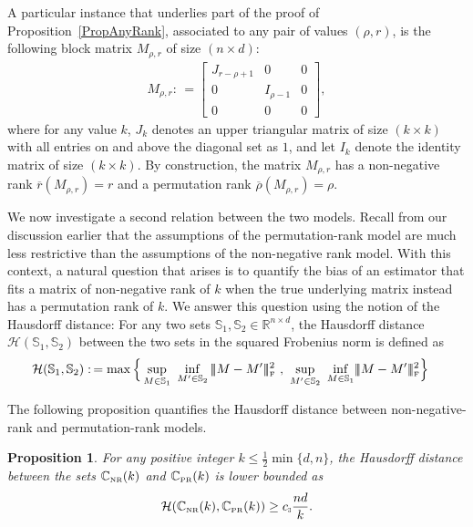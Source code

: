 \documentclass[11pt, hidelinks]{article} %
\newtheorem{proposition}{Proposition}
\newcommand{\matsnorm}[2]{|\!|\!| #1 | \! | \!|_{{#2}}}
\newcommand{\frobnorm}[1]{\ensuremath{\matsnorm{#1}{\mbox{\tiny{F}}}}}
\newcommand{\hausDis}{\mathcal{H}}
\newcommand{\defn}{\ensuremath{:\,=}}
\newcommand{\reals}{\ensuremath{\mathbb{R}}}
\newcommand{\upperonesmx}{J}
\newcommand{\identitymx}{I}
\newcommand{\numrows}{n}
\newcommand{\numcols}{d}
\newcommand{\plaincon}{c}
\newcommand{\UMODEL}{\ensuremath{\plaincon_{\mbox{\scalebox{.5}{3}}}}}
\newcommand{\wtmatrix}{M}
\newcommand{\wt}{\wtmatrix}
\newcommand{\matrixset}{\mathbb{C}}
\newcommand{\nnset}{\matrixset_{\mbox{\tiny NR}}}
\newcommand{\permset}{\matrixset_{\mbox{\tiny PR}}}
\newcommand{\nnrank}{r}
\newcommand{\permrank}{\rho}
\newcommand{\temprank}{k}
\newcommand{\fnpermrank}[1]{\overline{\permrank}(#1)}
\newcommand{\fnnnrank}[1]{\overline{\nnrank}(#1)}
\newcommand{\genclass}{\ensuremath{\mathbb{S}}}
\begin{document}
A particular instance that underlies part of the proof of
Proposition~\ref{PropAnyRank}, associated to any pair of values $(\permrank,\nnrank)$, is the following block matrix
$\wtmatrix_{\permrank, \nnrank}$ of size $(\numrows \times \numcols)$:
\begin{align*}
  \wtmatrix_{\permrank, \nnrank} \defn 
  \begin{bmatrix}
    \upperonesmx_{\nnrank - \permrank + 1} & 0 &
    0\\ 0 & \identitymx_{\permrank - 1} & 0\\ 0 &
    0 & 0
  \end{bmatrix},
\end{align*}
where for any value $k$,  
$\upperonesmx_{k}$ denotes an upper triangular matrix of size $(k
\times k)$ with all entries on and above the diagonal set as $1$, and
let $\identitymx_{k}$ denote the identity matrix of size $(k \times
k)$. By construction, the matrix $\wtmatrix_{\permrank, \nnrank}$ has a non-negative rank $\fnnnrank{\wtmatrix_{\permrank, \nnrank}} = \nnrank$ and a permutation rank
$\fnpermrank{\wtmatrix_{\permrank, \nnrank}} = \permrank$.

We now investigate a second relation between the two models. Recall
from our discussion earlier that the assumptions of the
permutation-rank model are much less restrictive than the assumptions
of the non-negative rank model. With this context, a natural question
that arises is to quantify the bias of an estimator that fits a matrix
of non-negative rank of $\temprank$ when the true underlying matrix
instead has a permutation rank of $\temprank$. We answer this question using the notion of the Hausdorff distance: For any two sets $\genclass_1, \genclass_2 \in \reals^{\numrows \times \numcols}$, the Hausdorff distance $\hausDis(\genclass_1,\genclass_2)$ between the two sets in the squared Frobenius norm is defined as
\begin{align}
\label{EqnDefnHausdorff}
\hausDis(\genclass_1, \genclass_2) \defn \max \Big\{ \sup \limits_{\wt
	\in \genclass_1} \ \inf \limits_{\wt' \in \genclass_2} \frobnorm{\wt
	- \wt'}^2 \ , \ \sup \limits_{\wt' \in \genclass_2} \ \inf
\limits_{\wt \in \genclass_1} & \frobnorm{\wt - \wt'}^2 \Big\}
\end{align}

The following proposition quantifies the Hausdorff distance between non-negative-rank and permutation-rank models.
\begin{proposition}
  \label{PropInclusion}
  For any positive integer $k \leq \frac{1}{2}\min\{\numcols,
  \numrows\}$, the Hausdorff distance between the sets $\nnset(k)$ and $\permset(k)$ is lower bounded as
  \begin{align}
  \label{EqnHausdorff}
 \hausDis( \nnset(k), \permset(k)) \geq \UMODEL \frac{\numrows \numcols}{k}.
  \end{align}
\end{proposition}
\end{document}
